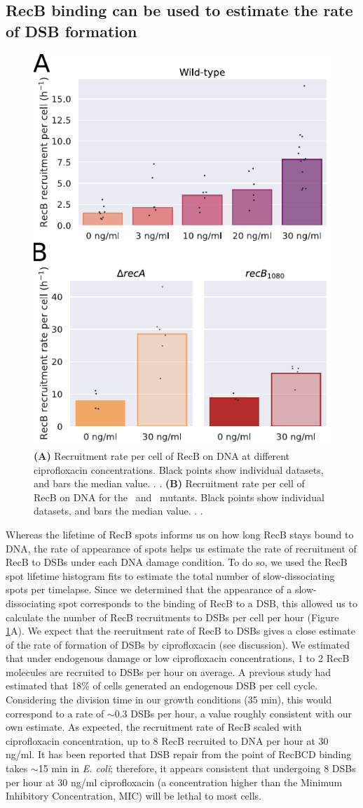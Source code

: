 \subsection*{RecB binding can be used to estimate the rate of DSB formation}

\begin{figure}[htbp]
    \centering
    \includegraphics[width=.4\textwidth]{Figures/Fig3_RecB_recruitment.pdf}
    \caption{\textbf{(A)} Recruitment rate per cell of RecB on DNA at different ciprofloxacin concentrations. Black points show individual datasets, and bars the median value. . . \textbf{(B)} Recruitment rate per cell of RecB on DNA for the \dreca\ and \geneteneighty\ mutants. Black points show individual datasets, and bars the median value. . .}
    \label{Fig:recruitment}
\end{figure}

Whereas the lifetime of RecB spots informs us on how long RecB stays bound to DNA, the rate of appearance of spots helps us estimate the rate of recruitment of RecB to DSBs under each DNA damage condition. To do so, we used the RecB spot lifetime histogram fits to estimate the total number of slow-dissociating spots per timelapse. Since we determined that the appearance of a slow-dissociating spot corresponds to the binding of RecB to a DSB, this allowed us to calculate the number of RecB recruitments to DSBs per cell per hour (Figure \ref{Fig:recruitment}A). We expect that the recruitment rate of RecB to DSBs gives a close estimate of the rate of formation of DSBs by ciprofloxacin (see discussion). We estimated that under endogenous damage or low ciprofloxacin concentrations, 1 to 2 RecB molecules are recruited to DSBs per hour on average. A previous study had estimated that 18\% of cells generated an endogenous DSB per cell cycle\cite{Sinha2018}. Considering the division time in our growth conditions (35 min), this would correspond to a rate of $\sim$0.3 DSBs per hour, a value roughly consistent with our own estimate. As expected, the recruitment rate of RecB scaled with ciprofloxacin concentration, up to 8 RecB recruited to DNA per hour at 30 ng/ml. It has been reported that DSB repair from the point of RecBCD binding takes $\sim$15 min in \emph{E. coli}\cite{Wiktor2021}; therefore, it appears consistent that undergoing 8 DSBs per hour at 30 ng/ml ciprofloxacin (a concentration higher than the Minimum Inhibitory Concentration, MIC) will be lethal to most cells.

